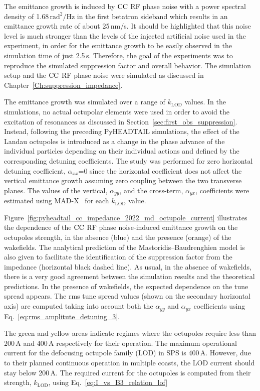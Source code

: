 The emittance growth is induced by ${\mathrm{CC}}$ RF phase noise with a power spectral density of 1.68\,$\mathrm{rad^2/Hz}$ in the first betatron sideband which results in an emittance growth rate of about 25\,nm/s. It should be highlighted that this noise level is much stronger than the levels of the injected artificial noise used in the experiment, in order for the emittance growth to be easily observed in the simulation time of just 2.5\,s. Therefore, the goal of the experiments was to reproduce the simulated suppression factor and overall behavior. The simulation setup and the ${\mathrm{CC}}$ RF phase noise were simulated as discussed in Chapter~\ref{Ch:suppression_impedance}. 

The emittance growth was simulated over a range of $k_\mathrm{LOD}$ values. In the simulations, no actual octupolar elements were used in order to avoid the excitation of resonances as discussed in Section~\ref{sec:first_obs_suppression}. Instead, following the preceding PyHEADTAIL simulations, the effect of the Landau octupoles is introduced as a change in the phase advance of the individual particles depending on their individual actions and defined by the corresponding detuning coefficients. The study was performed for zero horizontal detuning coefficient, $\alpha_{xx}$=0 since the horizontal coefficient does not affect the vertical emittance growth assuming zero coupling between the two transverse planes. The values of the vertical, $\alpha_{yy}$, and the cross-term, $\alpha_{yx}$, coefficients were estimated using MAD-X~\cite{madx} for each $k_\mathrm{LOD}$ value.

Figure~\ref{fig:pyheadtail_cc_impedance_2022_md_octupole_current} illustrates the dependence of the ${\mathrm{CC}}$ RF phase noise-induced emittance growth on the octupoles strength, in the absence (blue) and the presence (orange) of the wakefields. The analytical prediction of the Mastoridis--Baudrenghien model is also given to facilitate the identification of the suppression factor from the impedance (horizontal black dashed line). As usual, in the absence of wakefields, there is a very good agreement between the simulation results and the theoretical predictions. In the presence of wakefields, the expected dependence on the tune spread appears. The rms tune spread values (shown on the secondary horizontal axis) are computed taking into account both the $\alpha_{{yy}}$ and $\alpha_{{yx}}$ coefficients using Eq.~\eqref{eq:rms_amplitute_detuning_3}.

The green and yellow areas indicate regimes where the octupoles require less than 200\,A and 400\,A respectively for their operation. The maximum operational current for the defocusing octupole family (LOD) in SPS is 400\,A. However, due to their planned continuous operation in multiple coasts, the LOD current should stay below 200\,A. The required current for the octupoles is computed from their strength, $k_\mathrm{LOD}$, using Eq.~\eqref{eq:I_vs_B3_relation_lof}



